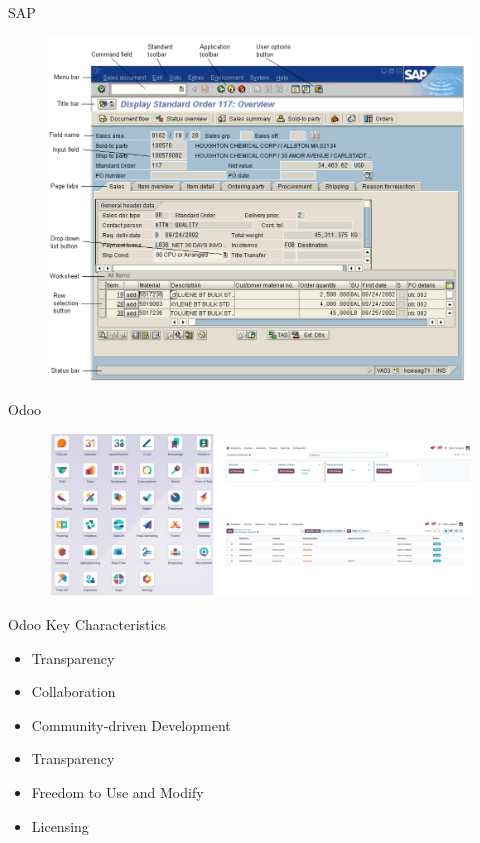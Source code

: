 \begin{frame}{SAP}
    
\begin{figure}
    \centering
    \includegraphics[width=0.50\linewidth]{assets/SAP.png}
\end{figure}

\end{frame}
\begin{frame}{Odoo}
    
\begin{figure}
    \centering
    \includegraphics[width=0.90\linewidth]{assets/OdooInterface.png}
\end{figure}

\end{frame}

\begin{frame}{Odoo Key Characteristics}
\begin{itemize}
    \item Transparency
    \item Collaboration
    \item Community-driven Development
    \item Transparency
    \item Freedom to Use and Modify
    \item Licensing
\end{itemize}
    
\end{frame}

